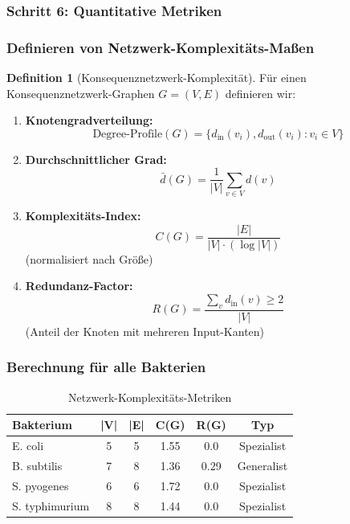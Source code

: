 \documentclass[a4paper,12pt]{article}
\theoremstyle{definition}
\newtheorem{definition}{Definition}
\begin{document}
\subsubsection{Schritt 6: Quantitative Metriken}

\subsubsection{Definieren von Netzwerk-Komplexitäts-Maßen}

\begin{definition}[Konsequenznetzwerk-Komplexität]

Für einen Konsequenznetzwerk-Graphen $G = (V, E)$ definieren wir:

\begin{enumerate}
    \item \textbf{Knotengradverteilung:} 
    \[
    \text{Degree-Profile}(G) = \{d_{\text{in}}(v_i), d_{\text{out}}(v_i) : v_i \in V\}
    \]
    
    \item \textbf{Durchschnittlicher Grad:}
    \[
    \bar{d}(G) = \frac{1}{|V|} \sum_{v \in V} d(v)
    \]
    
    \item \textbf{Komplexitäts-Index:}
    \[
    C(G) = \frac{|E|}{|V| \cdot (\log |V|)}
    \]
    (normalisiert nach Größe)
    
    \item \textbf{Redundanz-Factor:}
    \[
    R(G) = \frac{\sum_{v} d_{\text{in}}(v) \geq 2}{|V|}
    \]
    (Anteil der Knoten mit mehreren Input-Kanten)
\end{enumerate}

\end{definition}

\subsubsection{Berechnung für alle Bakterien}

\begin{table}[H]
\centering
\begin{tabular}{|l|c|c|c|c|c|}
\hline
\textbf{Bakterium} & \textbf{|V|} & \textbf{|E|} & \textbf{C(G)} & \textbf{R(G)} & \textbf{Typ} \\
\hline
E. coli & 5 & 5 & 1.55 & 0.0 & Spezialist \\
\hline
B. subtilis & 7 & 8 & 1.36 & 0.29 & Generalist \\
\hline
S. pyogenes & 6 & 6 & 1.72 & 0.0 & Spezialist \\
\hline
S. typhimurium & 8 & 8 & 1.44 & 0.0 & Spezialist \\
\hline
\end{tabular}
\caption{Netzwerk-Komplexitäts-Metriken}
\end{table}
\end{document}
